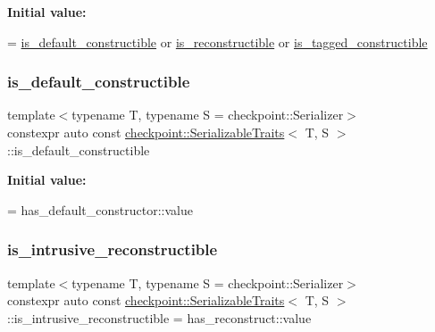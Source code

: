 {\bfseries Initial value\+:}
\begin{DoxyCode}
=
    \hyperlink{structcheckpoint_1_1_serializable_traits_a4bdbe26cdd11c7ff07f84e4cfdf34e7f}{is\_default\_constructible} or \hyperlink{structcheckpoint_1_1_serializable_traits_a6cc78a7cc9b4645727c92437619fce83}{is\_reconstructible} or 
      \hyperlink{structcheckpoint_1_1_serializable_traits_aa6618d9f36e37127006112c73755fceb}{is\_tagged\_constructible}
\end{DoxyCode}
\mbox{\label{structcheckpoint_1_1_serializable_traits_a4bdbe26cdd11c7ff07f84e4cfdf34e7f}} 
\subsubsection{\texorpdfstring{is\+\_\+default\+\_\+constructible}{is\_default\_constructible}}
{\footnotesize\ttfamily template$<$typename T, typename S = checkpoint\+::\+Serializer$>$ \\
constexpr auto const \hyperlink{structcheckpoint_1_1_serializable_traits}{checkpoint\+::\+Serializable\+Traits}$<$ T, S $>$\+::is\+\_\+default\+\_\+constructible\hspace{0.3cm}{\ttfamily [static]}}

{\bfseries Initial value\+:}
\begin{DoxyCode}
=
    has\_default\_constructor::value
\end{DoxyCode}
\mbox{\label{structcheckpoint_1_1_serializable_traits_a9879da69f4597dfb32b869142c1c46c9}} 
\subsubsection{\texorpdfstring{is\+\_\+intrusive\+\_\+reconstructible}{is\_intrusive\_reconstructible}}
{\footnotesize\ttfamily template$<$typename T, typename S = checkpoint\+::\+Serializer$>$ \\
constexpr auto const \hyperlink{structcheckpoint_1_1_serializable_traits}{checkpoint\+::\+Serializable\+Traits}$<$ T, S $>$\+::is\+\_\+intrusive\+\_\+reconstructible = has\+\_\+reconstruct\+::value\hspace{0.3cm}{\ttfamily [static]}}

